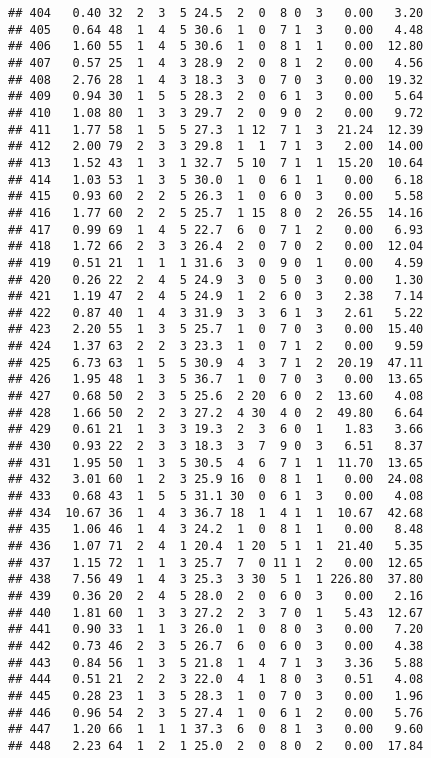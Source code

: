 \documentclass[
]{article}
\begin{document}
\begin{verbatim}
## 404   0.40 32  2  3  5 24.5  2  0  8 0  3   0.00   3.20
## 405   0.64 48  1  4  5 30.6  1  0  7 1  3   0.00   4.48
## 406   1.60 55  1  4  5 30.6  1  0  8 1  1   0.00  12.80
## 407   0.57 25  1  4  3 28.9  2  0  8 1  2   0.00   4.56
## 408   2.76 28  1  4  3 18.3  3  0  7 0  3   0.00  19.32
## 409   0.94 30  1  5  5 28.3  2  0  6 1  3   0.00   5.64
## 410   1.08 80  1  3  3 29.7  2  0  9 0  2   0.00   9.72
## 411   1.77 58  1  5  5 27.3  1 12  7 1  3  21.24  12.39
## 412   2.00 79  2  3  3 29.8  1  1  7 1  3   2.00  14.00
## 413   1.52 43  1  3  1 32.7  5 10  7 1  1  15.20  10.64
## 414   1.03 53  1  3  5 30.0  1  0  6 1  1   0.00   6.18
## 415   0.93 60  2  2  5 26.3  1  0  6 0  3   0.00   5.58
## 416   1.77 60  2  2  5 25.7  1 15  8 0  2  26.55  14.16
## 417   0.99 69  1  4  5 22.7  6  0  7 1  2   0.00   6.93
## 418   1.72 66  2  3  3 26.4  2  0  7 0  2   0.00  12.04
## 419   0.51 21  1  1  1 31.6  3  0  9 0  1   0.00   4.59
## 420   0.26 22  2  4  5 24.9  3  0  5 0  3   0.00   1.30
## 421   1.19 47  2  4  5 24.9  1  2  6 0  3   2.38   7.14
## 422   0.87 40  1  4  3 31.9  3  3  6 1  3   2.61   5.22
## 423   2.20 55  1  3  5 25.7  1  0  7 0  3   0.00  15.40
## 424   1.37 63  2  2  3 23.3  1  0  7 1  2   0.00   9.59
## 425   6.73 63  1  5  5 30.9  4  3  7 1  2  20.19  47.11
## 426   1.95 48  1  3  5 36.7  1  0  7 0  3   0.00  13.65
## 427   0.68 50  2  3  5 25.6  2 20  6 0  2  13.60   4.08
## 428   1.66 50  2  2  3 27.2  4 30  4 0  2  49.80   6.64
## 429   0.61 21  1  3  3 19.3  2  3  6 0  1   1.83   3.66
## 430   0.93 22  2  3  3 18.3  3  7  9 0  3   6.51   8.37
## 431   1.95 50  1  3  5 30.5  4  6  7 1  1  11.70  13.65
## 432   3.01 60  1  2  3 25.9 16  0  8 1  1   0.00  24.08
## 433   0.68 43  1  5  5 31.1 30  0  6 1  3   0.00   4.08
## 434  10.67 36  1  4  3 36.7 18  1  4 1  1  10.67  42.68
## 435   1.06 46  1  4  3 24.2  1  0  8 1  1   0.00   8.48
## 436   1.07 71  2  4  1 20.4  1 20  5 1  1  21.40   5.35
## 437   1.15 72  1  1  3 25.7  7  0 11 1  2   0.00  12.65
## 438   7.56 49  1  4  3 25.3  3 30  5 1  1 226.80  37.80
## 439   0.36 20  2  4  5 28.0  2  0  6 0  3   0.00   2.16
## 440   1.81 60  1  3  3 27.2  2  3  7 0  1   5.43  12.67
## 441   0.90 33  1  1  3 26.0  1  0  8 0  3   0.00   7.20
## 442   0.73 46  2  3  5 26.7  6  0  6 0  3   0.00   4.38
## 443   0.84 56  1  3  5 21.8  1  4  7 1  3   3.36   5.88
## 444   0.51 21  2  2  3 22.0  4  1  8 0  3   0.51   4.08
## 445   0.28 23  1  3  5 28.3  1  0  7 0  3   0.00   1.96
## 446   0.96 54  2  3  5 27.4  1  0  6 1  2   0.00   5.76
## 447   1.20 66  1  1  1 37.3  6  0  8 1  3   0.00   9.60
## 448   2.23 64  1  2  1 25.0  2  0  8 0  2   0.00  17.84

\end{verbatim}
\end{document}
